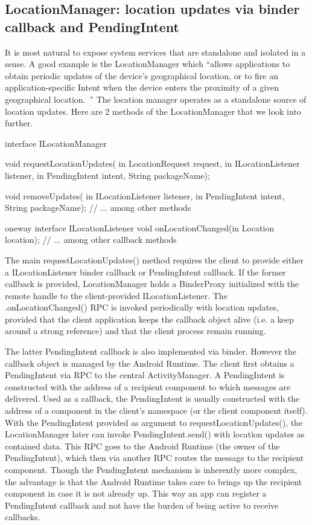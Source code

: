 \documentclass[prodmode]{acmlarge}
\begin{document}
\subsection{LocationManager: location updates via binder callback and PendingIntent}
It is most natural to expose system services that are standalone and isolated in a sense. A good example is the LocationManager which ``allows applications to obtain periodic updates of the device's geographical location, or to fire an application-specific Intent when the device enters the proximity of a given geographical location.~\cite{LocationManagerDocs}'' The location manager operates as a standalone source of location updates. Here are 2 methods of the LocationManager that we look into further.

\begin{snippet}
interface ILocationManager {
  void requestLocationUpdates(
      in LocationRequest request,
      in ILocationListener listener,
      in PendingIntent intent,
      String packageName);

  void removeUpdates(
      in ILocationListener listener,
      in PendingIntent intent,
      String packageName);
  // ... among other methods
}
\end{snippet}

\begin{snippet}
oneway interface ILocationListener {
    void onLocationChanged(in Location location);
    // ... among other callback methods
}
\end{snippet}

The main requestLocationUpdates() method requires the client to provide either a ILocationListener binder callback or PendingIntent callback. If the former callback is provided, LocationManager holds a BinderProxy initialized with the remote handle to the client-provided ILocationListener. The .onLocationChanged() RPC is invoked periodically with location updates, provided that the client application keeps the callback object alive (i.e. a keep around a strong reference) and that the client process remain running.

The latter PendingIntent callback is also implemented via binder. However the callback object is managed by the Android Runtime. The client first obtains a PendingIntent via RPC to the central ActivityManager. A PendingIntent is constructed with the address of a recipient component to which messages are delivered. Used as a callback, the PendingIntent is usually constructed with the address of a component in the client's namespace (or the client component itself). With the PendingIntent provided as argument to requestLocationUpdates(), the LocationManager later can invoke PendingIntent.send() with location updates as contained data. This RPC goes to the Android Runtime (the owner of the PendingIntent), which then via another RPC routes the message to the recipient component. Though the PendingIntent mechanism is inherently more complex, the advantage is that the Android Runtime takes care to brings up the recipient component in case it is not already up. This way an app can register a PendingIntent callback and not have the burden of being active to receive callbacks.
\end{document}
